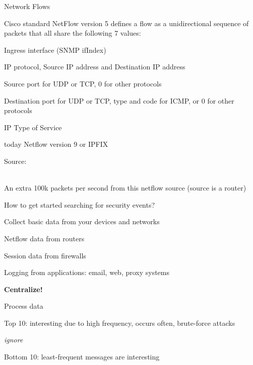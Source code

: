\documentclass[Screen16to9,17pt]{foils}
\begin{document}

\begin{list1}
\item Network Flows
\item Cisco standard NetFlow version 5 defines a flow as a unidirectional sequence of packets that all share the following 7 values:
\begin{list2}
\item Ingress interface (SNMP ifIndex)
\item IP protocol, Source IP address and Destination IP address
\item Source port for UDP or TCP, 0 for other protocols
\item Destination port for UDP or TCP, type and code for ICMP, or 0 for other protocols
\item IP Type of Service
\end{list2}
\item today Netflow version 9 or IPFIX
\end{list1}

Source: \\{\footnotesize
{}\\
}







\centerline{An extra 100k packets per second from this netflow source (source is a router)}



\begin{list1}
\item How to get started searching for security events?
\item Collect basic data from your devices and networks
\begin{list2}
\item Netflow data from routers
\item Session data from firewalls
\item Logging from applications: email, web, proxy systems
\end{list2}
\item {\bf Centralize!}
\item Process data
\begin{list2}
\item Top 10: interesting due to high frequency, occurs often, brute-force attacks
\item {\it ignore}
\item Bottom 10: least-frequent messages are interesting
\end{list2}
\end{list1}
\end{document}
